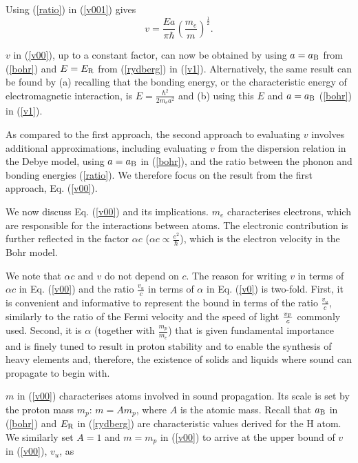 \documentclass[aps,prl,groupedaddress,fleqn,twocolumn,10pt]{revtex4}
\begin{document}
Using (\ref{ratio}) in (\ref{v001}) gives
\begin{equation}
v=\frac{Ea}{\pi\hbar}\left(\frac{m_e}{m}\right)^{\frac{1}{2}}.
\label{v1}
\end{equation}

$v$ in (\ref{v00}), up to a constant factor, can now be obtained by using $a=a_{\rm B}$ from (\ref{bohr}) and $E=E_{\rm R}$ from (\ref{rydberg}) in (\ref{v1}). Alternatively, the same result can be found by (a) recalling that the bonding energy, or the characteristic energy of electromagnetic interaction, is $E=\frac{\hbar^2}{2m_ea^2}$ and (b) using this $E$ and $a=a_{\rm B}$ (\ref{bohr}) in (\ref{v1}).

As compared to the first approach, the second approach to evaluating $v$ involves additional approximations, including evaluating $v$ from the dispersion relation in the Debye model, using $a=a_{\rm B}$ in (\ref{bohr}), and the ratio between the phonon and bonding energies (\ref{ratio}). We therefore focus on the result from the first approach, Eq. (\ref{v00}).

We now discuss Eq. (\ref{v00}) and its implications. $m_e$ characterises electrons, which are responsible for the interactions between atoms. The electronic contribution is further reflected in the factor $\alpha c$ ($\alpha c\propto\frac{e^2}{\hbar}$), which is the electron velocity in the Bohr model.

We note that $\alpha c$ and $v$ do not depend on $c$. The reason for writing $v$ in terms of $\alpha c$ in Eq. (\ref{v00}) and the ratio $\frac{v_u}{c}$ in terms of $\alpha$ in Eq. (\ref{v0}) is two-fold. First, it is convenient and informative to represent the bound in terms of the ratio $\frac{v_u}{c}$, similarly to the ratio of the Fermi velocity and the speed of light $\frac{v_{\rm F}}{c}$ commonly used. Second, it is $\alpha$ (together with $\frac{m_p}{m_e}$) that is given fundamental importance and is finely tuned to result in proton stability and to enable the synthesis of heavy elements \cite{barrow} and, therefore, the existence of solids and liquids where sound can propagate to begin with.

$m$ in (\ref{v00}) characterises atoms involved in sound propagation. Its scale is set by the proton mass $m_p$: $m=Am_p$, where $A$ is the atomic mass. Recall that $a_{\rm B}$ in (\ref{bohr}) and $E_{\rm R}$ in (\ref{rydberg}) are characteristic values derived for the H atom. We similarly set $A=1$ and $m=m_p$ in (\ref{v00}) to arrive at the upper bound of $v$ in (\ref{v00}), $v_u$, as
\end{document}

